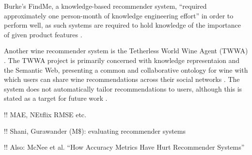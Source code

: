 Burke's FindMe, a knowledge-based recommender system, ``required approximately one person-month of knowledge engineering effort''\cite{Burke99b} in order to perform well, as such systems are required to hold knowledge of the importance of given product features \cite{Burke99b}.

Another wine recommender system is the Tetherless World Wine Agent (TWWA) \cite{Patton10}. The TWWA project is primarily concerned with knowledge representaion and the Semantic Web, presenting a common and collaborative ontology for wine with which users can share wine recommendations across their social networks \cite{TWWAIndex}. The system does not automatically tailor recommendations to users, although this is stated as a target for future work \cite{TWWAIndex}.


!! MAE, NEtflix RMSE etc.

!! Shani, Gurawander (M\$): evaluating recommender systems

!! Also: McNee et al. ``How Accuracy Metrics Have Hurt Recommender Systems''

